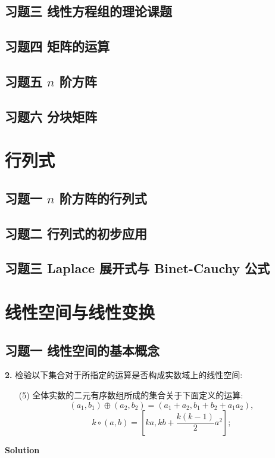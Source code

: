 \documentclass[11pt,a4paper,openany,oneside]{book}
\newcommand\Solution{\noindent\textbf{\textsf{Solution}}\par\medskip}
\begin{document}
\section{习题三 \quad 线性方程组的理论课题}
\section{习题四 \quad 矩阵的运算}
\section{习题五 \quad  $ n $  阶方阵}
\section{习题六 \quad 分块矩阵}

\chapter{行列式}
\section{习题一 \quad  $ n $  阶方阵的行列式}
\section{习题二 \quad 行列式的初步应用}
\section{习题三 \quad Laplace 展开式与 Binet-Cauchy 公式}

\chapter{线性空间与线性变换}
\section{习题一 \quad 线性空间的基本概念}

\hypertarget{4.1.2}{}
\begin{myexample}
	\textbf{2.} 检验以下集合对于所指定的运算是否构成实数域上的线性空间:
	\begin{enumerate}
	\item[(5)] 全体实数的二元有序数组所成的集合关于下面定义的运算:
	\[
	(a_1,b_1)\oplus(a_2,b_2)=(a_1+a_2,b_1+b_2+a_1a_2),
	\]
	\[
	k\circ (a,b)=\left[ka,kb+\frac{k(k-1)}{2}a^2\right];
	\]
	\end{enumerate}
	
\end{myexample}
\Solution
\end{document}
